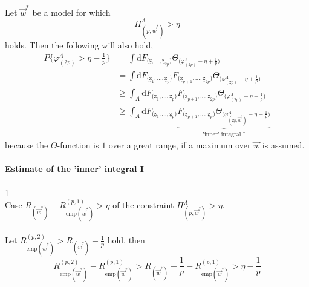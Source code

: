 Let $\vec{w}^*$ be a model for which 
\begin{equation}
	\Pi_{ (p,\vec{w}^* ) }^\Lambda > \eta
\end{equation}
holds. Then the following will also hold,
\begin{equation}
	\begin{array}{ll}
	P\Big\{ \varphi_{ (2p) }^\Lambda > \eta - \frac{1}{p}\Big\}
	& = \int \mathrm{d} 
		F_{ \big( \mathrm{\underline{z}}, \ldots,
			\mathrm{\underline{z}}_{2p} \big) } 
		\Theta_{ \big( 
			\varphi_{ (2p) }^\Lambda - \eta + \frac{1}{p} 
			\big) } \\
	& = \int \mathrm{d} 
		F_{ \big( \mathrm{\underline{z}}_1, \ldots,
			\mathrm{\underline{z}}_{p} \big) }
		F_{ \big( \mathrm{\underline{z}}_{ p + 1 }, \ldots,
			\mathrm{\underline{z}}_{2p} \big) }
		\Theta_{ \big( 
			\varphi_{ (2p) }^\Lambda - \eta + \frac{1}{p} 
			\big) } \\
	& \geq \int_A \mathrm{d} 
		F_{ \big( \mathrm{\underline{z}}_1, \ldots,
			\mathrm{\underline{z}}_{p} \big) }
		F_{ \big( \mathrm{\underline{z}}_{ p + 1 }, \ldots,
			\mathrm{\underline{z}}_{2p} \big) }
		\Theta_{ \big( 
			\varphi_{ (2p) }^\Lambda - \eta + \frac{1}{p} 
			\big) } \\
	& \geq \int_A \mathrm{d} 
		F_{ \big( \mathrm{\underline{z}}_1, \ldots,
			\mathrm{\underline{z}}_{p} \big) }
	\underbrace{ F_{ \big( \mathrm{\underline{z}}_{ p + 1 }, \ldots,
			\mathrm{\underline{z}}_{p} \big) }
		 \Theta_{ \big( 
			\varphi_{ (2p, \vec{w}^* ) }^\Lambda 
			- \eta + \frac{1}{p} 
			\big) } }_{ \textrm{'inner' integral I} }
	\end{array}
\end{equation}
because the $\Theta$-function is $1$ over a great range, if a maximum over $\vec{w}$ is assumed.
\\\\
{\bf Estimate of the 'inner' integral I} \\\\
\noindent\textcircled{1}\\
Case $R_{ ( \vec{w}^* ) } - R_{ \mathrm{emp}( \vec{w}^* ) }^{ (p, 1) } > \eta$ of the constraint $\Pi_{ (p, \vec{w}^* ) }^\Lambda > \eta$.\\\\
Let $R_{ \mathrm{emp}( \vec{w}^* ) }^{ (p, 2) } > R_{ ( \vec{w}^* ) } - \frac{1}{p}$ hold, then
\begin{equation}
	R_{ \mathrm{emp}( \vec{w}^* ) }^{ (p, 2) } 
	- R_{ \mathrm{emp}( \vec{w}^* ) }^{ (p, 1) }
	> R_{ ( \vec{w}^* ) } - \frac{1}{p} 
	- R_{ \mathrm{emp}( \vec{w}^* ) }^{ (p, 1) }
	> \eta - \frac{1}{p}
\end{equation}
